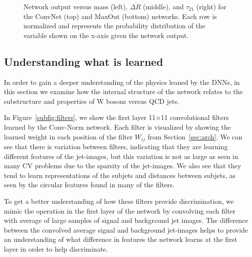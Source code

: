 \begin{figure}[htbp!]
\begin{center}
      \caption{Network output versus mass (left), $\Delta R$ (middle), and $\tau_{21}$ (right) for the ConvNet (top) and MaxOut (bottom) networks.  Each row is normalized and represents the probability distribution of the variable shown on the x-axis given the network output.}
      \label{fig:qcdsculpt}

    \end{center}
\end{figure}

\subsection{Understanding what is learned} %
\label{ssub:understanding_what_is_learned}

In order to gain a deeper understanding of the physics leaned by the DNNs, in this section we examine how the internal structure of the network relates to the substructure and properties of W bosons versus QCD jets.



In Figure~\ref{subfig:filters}, we show the first layer 11$\times$11 convolutional filters learned by the Conv-Norm network. Each filter is visualized by showing the learned weight in each position of the filter $W_{ij}$ from Section~\ref{sec:arch}.  We can see that there is variation between filters, indicating that they are learning different features of the jet-images, but this variation is not as large as seen in many CV problems due to the sparsity of the jet-images.  We also see that they tend to learn representations of the subjets and distances between subjets, as seen by the circular features found in many of the filters.

To get a better understanding of how these filters provide discrimination, we mimic the operation in the first layer of the network by convolving each filter with average of large samples of signal and background jet images.  The difference between the convolved average signal and background jet-images helps to provide an understanding of what difference in features the network learns at the first layer in order to help discriminate.

